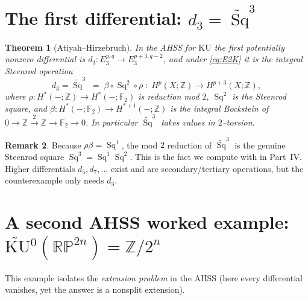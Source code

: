\documentclass[11pt]{article}
\newtheorem{theorem}{Theorem}[section]
\theoremstyle{definition}
\newtheorem{remark}[theorem]{Remark}
\DeclareMathOperator{\Sq}{Sq}
\newcommand{\Z}{\mathbb{Z}}
\newcommand{\F}{\mathbb{F}}
\newcommand{\RP}{\mathbb{RP}}
\newcommand{\KU}{\mathrm{KU}}
\begin{document}
\section{The first differential: $d_3=\widetilde{\Sq}^3$}

\begin{theorem}[Atiyah--Hirzebruch]\label{thm:d3}
In the AHSS for $\KU$ the first potentially nonzero differential is
$d_3\colon E_3^{p,q}\to E_3^{p+3,q-2}$, and under \eqref{eq:E2K} it is the
\emph{integral Steenrod operation}
\[
  d_3=\widetilde{\Sq}^3\;=\;\beta\circ \Sq^2\circ \rho
  \;\colon\; H^{p}(X;\Z)\to H^{p+3}(X;\Z),
\]
where $\rho\colon H^*(-;\Z)\to H^*(-;\F_2)$ is reduction mod $2$, $\Sq^2$ is the
Steenrod square, and $\beta\colon H^*(-;\F_2)\to H^{*+1}(-;\Z)$ is the integral
Bockstein of $0\to\Z\xrightarrow{2}\Z\to\F_2\to 0$. In particular
$\widetilde{\Sq}^3$ takes values in $2$--torsion.
\end{theorem}

\begin{remark}
Because $\rho\beta=\Sq^1$, the mod $2$ reduction of $\widetilde{\Sq}^3$ is the
genuine Steenrod square $\Sq^3=\Sq^1\Sq^2$. This is the fact we compute with in
Part~IV. Higher differentials $d_5,d_7,\dots$ exist and are secondary/tertiary
operations, but the counterexample only needs $d_3$.
\end{remark}

\section{A second AHSS worked example: $\widetilde{\KU}{}^0(\RP^{2n})=\Z/2^n$}

This example isolates the \emph{extension problem} in the AHSS (here every
differential vanishes, yet the answer is a nonsplit extension).
\end{document}
